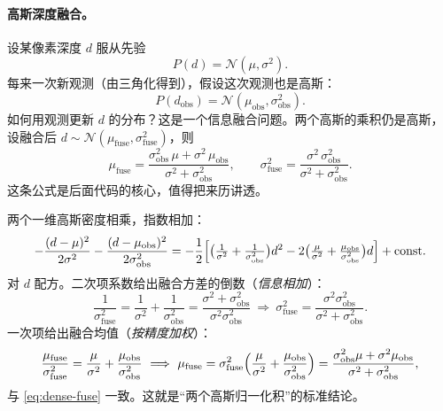 \paragraph{高斯深度融合。}
设某像素深度 $d$ 服从先验
\begin{equation}
  P(d)=\mathcal{N}(\mu,\sigma^2).
  \label{eq:dense-prior}
\end{equation}
每来一次新观测（由三角化得到），假设这次观测也是高斯：
\begin{equation}
  P(d_{\mathrm{obs}})=\mathcal{N}(\mu_{\mathrm{obs}},\sigma_{\mathrm{obs}}^2).
  \label{eq:dense-obs}
\end{equation}
如何用观测更新 $d$ 的分布？这是一个信息融合问题。两个高斯的乘积仍是高斯，设融合后 $d\sim\mathcal{N}(\mu_{\mathrm{fuse}},\sigma_{\mathrm{fuse}}^2)$，则
\begin{equation}
  \mu_{\mathrm{fuse}}=\frac{\sigma_{\mathrm{obs}}^2\,\mu+\sigma^2\,\mu_{\mathrm{obs}}}{\sigma^2+\sigma_{\mathrm{obs}}^2},\qquad
  \sigma_{\mathrm{fuse}}^2=\frac{\sigma^2\,\sigma_{\mathrm{obs}}^2}{\sigma^2+\sigma_{\mathrm{obs}}^2}.
  \label{eq:dense-fuse}
\end{equation}
这条公式是后面代码的核心，值得把来历讲透。

\begin{derivation}
两个一维高斯密度相乘，指数相加：
\[
  -\frac{(d-\mu)^2}{2\sigma^2}-\frac{(d-\mu_{\mathrm{obs}})^2}{2\sigma_{\mathrm{obs}}^2}
  =-\frac12\Bigl[\bigl(\tfrac{1}{\sigma^2}+\tfrac{1}{\sigma_{\mathrm{obs}}^2}\bigr)d^2
   -2\bigl(\tfrac{\mu}{\sigma^2}+\tfrac{\mu_{\mathrm{obs}}}{\sigma_{\mathrm{obs}}^2}\bigr)d\Bigr]+\mathrm{const}.
\]
对 $d$ 配方。二次项系数给出融合方差的倒数（\emph{信息相加}）：
\[
  \frac{1}{\sigma_{\mathrm{fuse}}^2}=\frac{1}{\sigma^2}+\frac{1}{\sigma_{\mathrm{obs}}^2}
  =\frac{\sigma^2+\sigma_{\mathrm{obs}}^2}{\sigma^2\sigma_{\mathrm{obs}}^2}
  \ \Longrightarrow\ \sigma_{\mathrm{fuse}}^2=\frac{\sigma^2\sigma_{\mathrm{obs}}^2}{\sigma^2+\sigma_{\mathrm{obs}}^2}.
\]
一次项给出融合均值（\emph{按精度加权}）：
\[
  \frac{\mu_{\mathrm{fuse}}}{\sigma_{\mathrm{fuse}}^2}=\frac{\mu}{\sigma^2}+\frac{\mu_{\mathrm{obs}}}{\sigma_{\mathrm{obs}}^2}
  \ \Longrightarrow\ \mu_{\mathrm{fuse}}=\sigma_{\mathrm{fuse}}^2\Bigl(\frac{\mu}{\sigma^2}+\frac{\mu_{\mathrm{obs}}}{\sigma_{\mathrm{obs}}^2}\Bigr)
  =\frac{\sigma_{\mathrm{obs}}^2\mu+\sigma^2\mu_{\mathrm{obs}}}{\sigma^2+\sigma_{\mathrm{obs}}^2},
\]
与 \cref{eq:dense-fuse} 一致。这就是“两个高斯归一化积”的标准结论。
\end{derivation}

